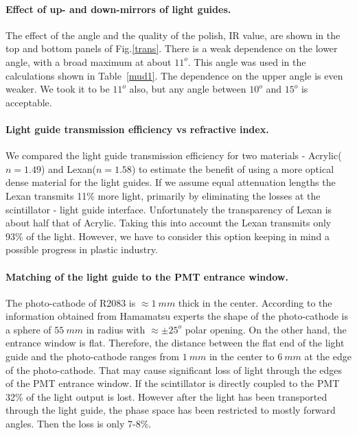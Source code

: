 \paragraph{Effect of up- and down-mirrors of light guides.}
The effect of the angle and the quality of the polish, IR value, are shown in the top and bottom panels 
of Fig.\ref{trans}.
There is a weak dependence on the lower angle, with a broad maximum at about $11^o$. 
This angle was used in the calculations shown in Table~\ref{mud1}.
The dependence on the upper angle is even weaker. We took it to be $11^o$ also, but any angle between $10^o$ and $15^o$ is acceptable. 

\paragraph{Light guide transmission efficiency vs refractive index.}

We compared the light guide transmission efficiency
for two materials - Acrylic($n=1.49$) and Lexan($n=1.58$) to estimate the benefit of using
a  more optical dense material for the light guides.
If we assume equal attenuation lengths the Lexan transmits 11\% more light, primarily by eliminating the losses at the scintillator - light guide interface. 
Unfortunately the transparency  of Lexan is about half that of  Acrylic.
Taking this into account the Lexan transmits only 93\% of the light. 
However, we have to consider
this option keeping in mind a possible  progress in plastic industry.

\paragraph{Matching of the light guide to the PMT entrance window.}
The photo-cathode of R2083 is $\approx1~mm$ thick in the center.
According to the information obtained from Hamamatsu experts
the shape of the photo-cathode is  a sphere of $55~mm$ in radius with $\approx \pm 25^o$ polar opening.
On the other hand,   the entrance window is flat.
Therefore, the distance between the flat end of the light guide and the 
photo-cathode ranges from $1~mm$ in the center to $6~mm$ at the edge of the photo-cathode. 
That may cause significant loss of light through the edges of the PMT entrance window.
If the scintillator is directly coupled to the PMT 32\% of the light output is lost. 
However after the light has been transported through the light guide, the phase space has been restricted to mostly forward angles. Then the loss is only 7-8\%.

